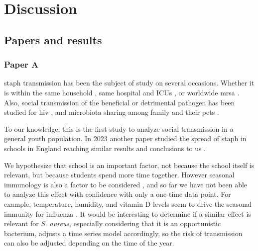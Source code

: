 \chapter{Discussion}\label{ch:discussion}






\section{Papers and results}

\subsection{Paper A}


\gls{staph} transmission has been the subject of study on several occasions. Whether it is within the same household \cite{Knox2015, Zhu2021}, same hospital and ICUs \cite{LeBihan2017, Solberg2000}, or worldwide \gls{mrsa} \cite{Ayliffe1997}. Also, social transmission of the beneficial or detrimental pathogen has been studied for \gls{hiv} \cite{Rothenberg1998}, and microbiota sharing among family and their pets \cite{Song2013}.

To our knowledge, this is the first study to analyze social transmission in a general youth population. In 2023 another paper studied the spread of \gls{staph} in schools in England reaching similar results and conclusions to us \cite{vanTonder2023}.


We hypothesize that school is an important factor, not because the school itself is relevant, but because students spend more time together. However seasonal immunology is also a factor to be considered \cite{Lund2022}, and so far we have not been able to analyze this effect with confidence with only a one-time data point. For example, temperature, humidity, and vitamin D levels seem to drive the seasonal immunity for influenza \cite{https://doi.org/10.48550/arxiv.1908.00925}. It would be interesting to determine if a similar effect is relevant for \textit{S. aureus}, especially considering that it is an opportunistic bacterium, adjusts a time series model accordingly, so the risk of transmission can also be adjusted depending on the time of the year.

